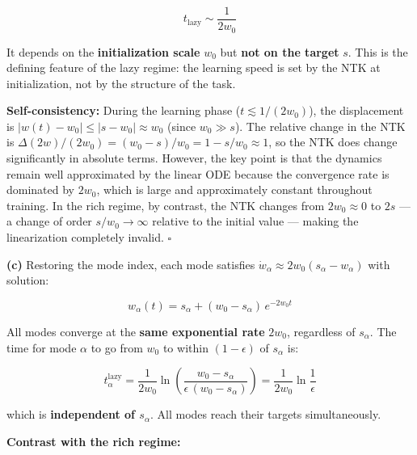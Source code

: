 \documentclass[
]{article}
\begin{document}
\[t_{\text{lazy}} \sim \frac{1}{2w_0}\]

It depends on the \textbf{initialization scale} \(w_0\) but \textbf{not
on the target} \(s\). This is the defining feature of the lazy regime:
the learning speed is set by the NTK at initialization, not by the
structure of the task.

\textbf{Self-consistency:} During the learning phase
(\(t \lesssim 1/(2w_0)\)), the displacement is
\(|w(t) - w_0| \leq |s - w_0| \approx w_0\) (since \(w_0 \gg s\)). The
relative change in the NTK is
\(\Delta(2w)/(2w_0) = (w_0 - s)/w_0 = 1 - s/w_0 \approx 1\), so the NTK
does change significantly in absolute terms. However, the key point is
that the dynamics remain well approximated by the linear ODE because the
convergence rate is dominated by \(2w_0\), which is large and
approximately constant throughout training. In the rich regime, by
contrast, the NTK changes from \(2w_0 \approx 0\) to \(2s\) --- a change
of order \(s/w_0 \to \infty\) relative to the initial value --- making
the linearization completely invalid. \(\square\)

\textbf{(c)} Restoring the mode index, each mode satisfies
\(\dot{w}_\alpha \approx 2w_0(s_\alpha - w_\alpha)\) with solution:

\[w_\alpha(t) = s_\alpha + (w_0 - s_\alpha)\,e^{-2w_0 t}\]

All modes converge at the \textbf{same exponential rate} \(2w_0\),
regardless of \(s_\alpha\). The time for mode \(\alpha\) to go from
\(w_0\) to within \((1-\epsilon)\) of \(s_\alpha\) is:

\[t_\alpha^{\text{lazy}} = \frac{1}{2w_0}\ln\!\left(\frac{w_0 - s_\alpha}{\epsilon\,(w_0 - s_\alpha)}\right) = \frac{1}{2w_0}\ln\frac{1}{\epsilon}\]

which is \textbf{independent of \(s_\alpha\)}. All modes reach their
targets simultaneously.

\textbf{Contrast with the rich regime:}
\end{document}
